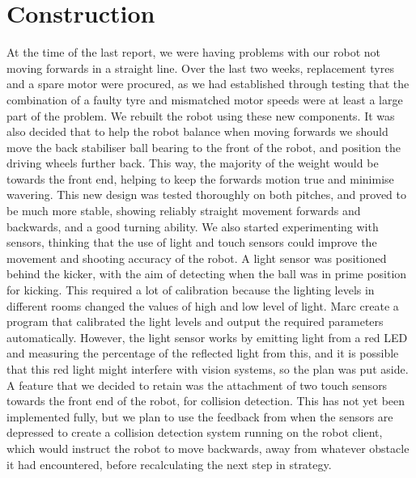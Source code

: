 \documentclass[conference,12pt]{IEEEtran}
\begin{document}
\section{Construction}	
\vspace{-2 mm}
At the time of the last report, we were having problems with our robot not moving forwards in a straight line. Over the last two weeks, replacement tyres and a spare motor were procured, as we had established through testing that the combination of a faulty tyre and mismatched motor speeds were at least a large part of the problem. We rebuilt the robot using these new components. It was also decided that to help the robot balance when moving forwards we should move the back stabiliser ball bearing to the front of the robot, and position the driving wheels further back. This way, the majority of the weight would be towards the front end, helping to keep the forwards motion true and minimise wavering. This new design was tested thoroughly on both pitches, and proved to be much more stable, showing reliably straight movement forwards and backwards, and a good turning ability.
We also started experimenting with sensors, thinking that the use of light and touch sensors could improve the movement and shooting accuracy of the robot. A light sensor was positioned behind the kicker, with the aim of detecting when the ball was in prime position for kicking. This required a lot of calibration because the lighting levels in different rooms changed the values of high and low level of light. Marc create a program that calibrated the light levels and output the required parameters automatically. However, the light sensor works by emitting light from a red LED and measuring the percentage of the reflected light from this, and it is possible that this red light might interfere with vision systems, so the plan was put aside. A feature that we decided to retain was the attachment of two touch sensors towards the front end of the robot, for collision detection. This has not yet been implemented fully, but we plan to use the feedback from when the sensors are depressed to create a collision detection system running on the robot client, which would instruct the robot to move backwards, away from whatever obstacle it had encountered, before recalculating the next step in strategy.
\vspace{-2 mm}
\end{document}
